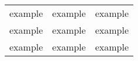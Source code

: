 \documentclass{article}
\begin{document}
\begin{center}
\begin{tabular}{ c  c  c }
example & example & example
\\
example & example & example
\\
example & example & example
\end{tabular}
\end{center}
\end{document}
